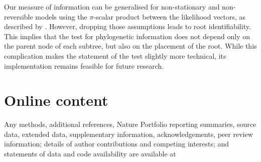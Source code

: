 
Our measure of information can be generalised for non-stationary and non-reversible models using the $\pi$-scalar product between the likelihood vectors, as described by . However, dropping those assumptions leads to root identifiability. This implies that the test for phylogenetic information does not depend only on the parent node of each subtree, but also on the placement of the root. While this complication makes the statement of the test slightly more technical, its implementation remains feasible for future research. 



\section*{Online content}

{\color{blue}Any methods, additional references, Nature Portfolio reporting summaries, source data, extended data, supplementary information, acknowledgements, peer review information; details of author contributions and competing interests; and statements of data and code availability are available at  }


\backmatter
 




